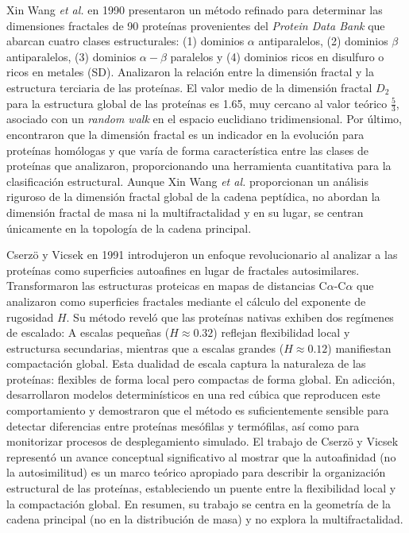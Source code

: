 Xin Wang \textit{et al.} \cite{Wang1990} en 1990 presentaron un m\'{e}todo refinado para determinar las dimensiones fractales de 90 prote\'{i}nas provenientes del \textit{Protein Data Bank} que abarcan cuatro clases estructurales: (1) dominios $\alpha$ antiparalelos, (2) dominios $\beta$ antiparalelos, (3) dominios $\alpha-\beta$ paralelos y (4) dominios ricos en disulfuro o ricos en metales (SD). Analizaron la relaci\'{o}n entre la dimensi\'{o}n fractal y la estructura terciaria de las prote\'{i}nas. El valor medio de la dimensi\'{o}n fractal $D_{2}$ para la estructura global de las prote\'{i}nas es 1.65, muy cercano al valor te\'{o}rico $\frac{5}{3}$, asociado con un \textit{random walk} en el espacio euclidiano tridimensional. Por \'{u}ltimo, encontraron que la dimensi\'{o}n fractal es un indicador en la evoluci\'{o}n para prote\'{i}nas hom\'{o}logas y que var\'{i}a de forma caracter\'{i}stica entre las clases de prote\'{i}nas que analizaron, proporcionando una herramienta cuantitativa para la clasificaci\'{o}n estructural. Aunque Xin Wang \textit{et al.} proporcionan un análisis riguroso de la dimensión fractal global de la cadena peptídica, no abordan la dimensión fractal de masa ni la multifractalidad y en su lugar, se centran únicamente en la topología de la cadena principal.

Cserzö y Vicsek en 1991 \cite{Cserzo1991} introdujeron un enfoque revolucionario al analizar a las prote\'{i}nas como superficies autoafines en lugar de fractales autosimilares. Transformaron las estructuras proteicas en mapas de distancias C$\alpha$-C$\alpha$ que analizaron como superficies fractales mediante el c\'{a}lculo del exponente de rugosidad $H$. Su m\'{e}todo revel\'{o} que las prote\'{i}nas nativas exhiben dos reg\'{i}menes de escalado: A escalas pequeñas ($H \approx 0.32$) reflejan flexibilidad local y estructursa secundarias, mientras que a escalas grandes ($H \approx 0.12$) manifiestan compactaci\'{o}n global. Esta dualidad de escala captura la naturaleza de las prote\'{i}nas: flexibles de forma local pero compactas de forma global. En adicción, desarrollaron modelos determin\'{i}sticos en una red c\'{u}bica que reproducen este comportamiento y demostraron que el m\'{e}todo es suficientemente sensible para detectar diferencias entre prote\'{i}nas mes\'{o}filas y term\'{o}filas, as\'{i} como para monitorizar procesos de desplegamiento simulado. El trabajo de Cserzö y Vicsek represent\'{o} un avance conceptual significativo al mostrar que la autoafinidad (no la autosimilitud) es un marco teórico apropiado para describir la organizaci\'{o}n estructural de las prote\'{i}nas, estableciendo un puente entre la flexibilidad local y la compactaci\'{o}n global.  En resumen, su trabajo se centra en la geometría de la cadena principal (no en la distribución de masa) y no explora la multifractalidad.


